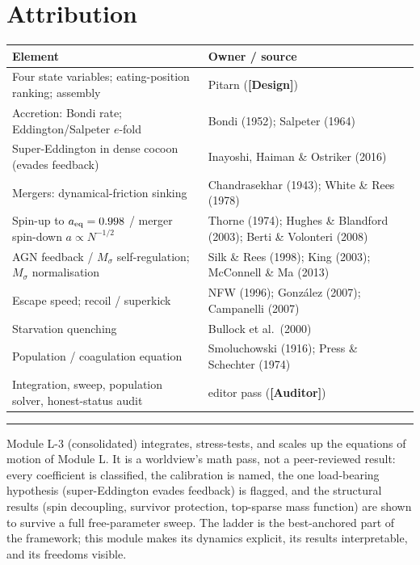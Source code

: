 \documentclass[11pt]{article}
\newcommand{\Design}{\textbf{\textcolor{purple!65!black}{[Design]}}}
\newcommand{\Auditor}{\textbf{\textcolor{teal!55!black}{[Auditor]}}}
\newcommand{\Msig}{M_\sigma}
\begin{document}
\section{Attribution}
\begin{center}\small
\begin{tabular}{@{}p{}p{}@{}}
\toprule
Element & Owner / source \\
\midrule
Four state variables; eating-position ranking; assembly & Pitarn (\Design) \\
Accretion: Bondi rate; Eddington/Salpeter $e$-fold & Bondi (1952); Salpeter (1964) \\
Super-Eddington in dense cocoon (evades feedback) & Inayoshi, Haiman \& Ostriker (2016) \\
Mergers: dynamical-friction sinking & Chandrasekhar (1943); White \& Rees (1978) \\
Spin-up to $a_{\rm eq}=0.998$ / merger spin-down $a\!\propto\!N^{-1/2}$ & Thorne (1974); Hughes \& Blandford (2003); Berti \& Volonteri (2008) \\
AGN feedback / $\Msig$ self-regulation; $\Msig$ normalisation & Silk \& Rees (1998); King (2003); McConnell \& Ma (2013) \\
Escape speed; recoil / superkick & NFW (1996); Gonz\'alez (2007); Campanelli (2007) \\
Starvation quenching & Bullock et al.\ (2000) \\
Population / coagulation equation & Smoluchowski (1916); Press \& Schechter (1974) \\
Integration, sweep, population solver, honest-status audit & editor pass (\Auditor) \\
\bottomrule
\end{tabular}
\end{center}

\vspace{4pt}\hrule\vspace{4pt}
{\small Module L-3 (consolidated) integrates, stress-tests, and scales up the equations of motion of Module L. It is a worldview's math pass, not a peer-reviewed result: every coefficient is classified, the calibration is named, the one load-bearing hypothesis (super-Eddington evades feedback) is flagged, and the structural results (spin decoupling, survivor protection, top-sparse mass function) are shown to survive a full free-parameter sweep. The ladder is the best-anchored part of the framework; this module makes its dynamics explicit, its results interpretable, and its freedoms visible.}
\end{document}
